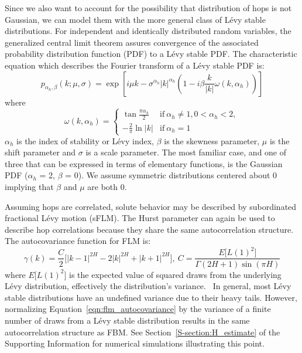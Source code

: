 \documentclass[12pt]{article}
\begin{document}
  Since we also want to account for the possibility that distribution of hops is 
  not Gaussian, we can model them with the more general class of L\'evy stable 
  distributions. For independent and identically distributed random variables, 
  the generalized central limit theorem assures convergence of the associated 
  probability distribution function (PDF) to a L\'evy stable PDF. \cite{klages_anomalous_2008}
  The characteristic equation which describes the Fourier transform of a L\'evy stable PDF is:
  \begin{equation}
    p_{\alpha_h, \beta}(k;\mu,\sigma) =\exp\left[i\mu k - \sigma^{\alpha_h}|k|^{\alpha_h}\left(1 - i\beta\frac{k}{|k|}\omega(k, \alpha_h)\right)\right]
  \end{equation}
  where \\
  \[\omega(k, \alpha_h) = \begin{cases}
  	\tan{\frac{\pi \alpha_h}{2}} & \text{if}~\alpha_h \neq 1, 0 < \alpha_h < 2, \\
  	-\frac{2}{\pi}\ln |k| & \text{if}~\alpha_h = 1
  	 \end{cases}
  \]
  $\alpha_h$ is the index of stability or L\'evy index, $\beta$ is the skewness 
  parameter, $\mu$ is the shift parameter and $\sigma$ is a scale parameter. The most
  familiar case, and one of three that can be expressed in terms of elementary functions,
  is the Gaussian PDF ($\alpha_h$ = 2, $\beta$ = 0). We assume symmetric distributions
  centered about 0 implying that $\beta$ and $\mu$ are both 0.
  
  Assuming hops are correlated, solute behavior may be described by subordinated 
  fractional L\'evy motion (sFLM). The Hurst parameter can again be used to describe
  hop correlations because they share the same autocorrelation structure.~\cite{tikanmaki_fractional_2010}
  The autocovariance function for FLM is:
  \begin{equation}
    \gamma(k) = \dfrac{C}{2}\bigg[|k-1|^{2H} - 2|k|^{2H} + |k+1|^{2H}\bigg],
    ~C = \frac{E\big[L(1)^2\big]}{\Gamma(2H + 1)\sin(\pi H)}
    \label{eqn:flm_autocovariance}
  \end{equation}
  where $E\big[L(1)^2\big]$ is the expected value of squared draws from the 
  underlying L\'evy distribution, effectively the distribution's 
  variance.~\cite{bishwal_maximum_2011} In general, most L\'evy stable distributions
  have an undefined variance due to their heavy tails. However, normalizing
  Equation~\ref{eqn:flm_autocovariance} by the variance of a finite number of draws
  from a L\'evy stable distribution results in the same autocorrelation structure as FBM.
  See Section~\ref{S-section:H_estimate} of the Supporting Information for numerical
  simulations illustrating this point.  %
  
\end{document}
